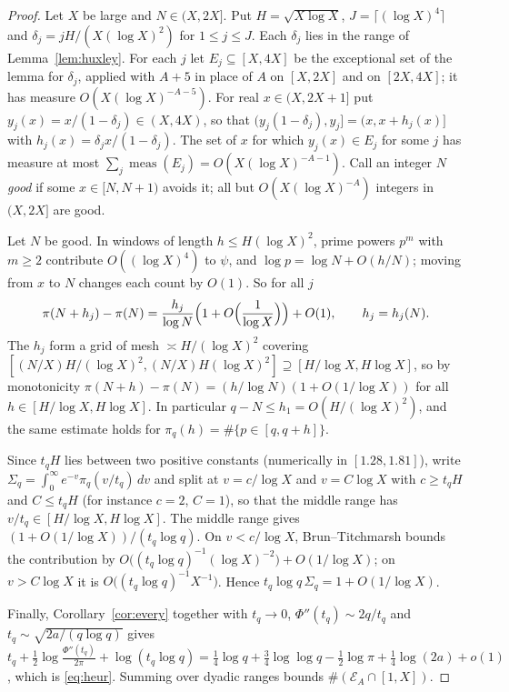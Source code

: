 \documentclass[11pt]{article}
\theoremstyle{remark}
\begin{document}
\begin{proof}
Let $X$ be large and $N\in(X,2X]$. Put $H=\sqrt{X\log X}$, $J=\lceil(\log X)^4\rceil$ and
$\delta_j=jH/(X(\log X)^2)$ for $1\le j\le J$. Each $\delta_j$ lies in the range of
Lemma~\ref{lem:huxley}. For each $j$ let $E_j\subseteq[X,4X]$ be the exceptional set of the lemma
for $\delta_j$, applied with $A+5$ in place of $A$ on $[X,2X]$ and on $[2X,4X]$; it has measure
$O(X(\log X)^{-A-5})$. For real $x\in(X,2X+1]$ put $y_j(x)=x/(1-\delta_j)\in(X,4X)$, so that
$(y_j(1-\delta_j),y_j]=(x,x+h_j(x)]$ with $h_j(x)=\delta_jx/(1-\delta_j)$. The set of $x$ for
which $y_j(x)\in E_j$ for some $j$ has measure at most
$\sum_j\operatorname{meas}(E_j)=O(X(\log X)^{-A-1})$. Call an integer $N$
\emph{good} if some $x\in[N,N+1)$ avoids it; all but $O(X(\log X)^{-A})$ integers in
$(X,2X]$ are good.

Let $N$ be good. In windows of length $h\le H(\log X)^2$, prime powers $p^m$ with $m\ge2$
contribute $O((\log X)^4)$ to $\psi$, and $\log p=\log N+O(h/N)$; moving from $x$ to $N$ changes
each count by $O(1)$. So for all $j$
\[
\pi(N+h_j)-\pi(N)=\frac{h_j}{\log N}\Bigl(1+O\Bigl(\frac1{\log X}\Bigr)\Bigr)+O(1),
\qquad h_j=h_j(N).
\]
The $h_j$ form a grid of mesh $\asymp H/(\log X)^2$ covering
$[(N/X)H/(\log X)^2,(N/X)H(\log X)^2]\supseteq[H/\log X,H\log X]$, so by monotonicity $\pi(N+h)-\pi(N)=(h/\log N)(1+O(1/\log X))$ for all
$h\in[H/\log X,H\log X]$. In particular $q-N\le h_1=O(H/(\log X)^2)$, and the same estimate
holds for $\pi_q(h)=\#\{p\in[q,q+h]\}$.

Since $t_qH$ lies between two positive constants (numerically in $[1.28,1.81]$), write
$\Sigma_q=\int_0^\infty e^{-v}\pi_q(v/t_q)\,dv$ and split at $v=c/\log X$ and $v=C\log X$ with
$c\ge t_qH$ and $C\le t_qH$ (for instance $c=2$, $C=1$), so that the middle range has
$v/t_q\in[H/\log X,H\log X]$. The middle range gives $(1+O(1/\log X))/(t_q\log q)$. On
$v<c/\log X$, Brun--Titchmarsh bounds the contribution by
$O\bigl((t_q\log q)^{-1}(\log X)^{-2}\bigr)+O(1/\log X)$; on $v>C\log X$ it is
$O\bigl((t_q\log q)^{-1}X^{-1}\bigr)$. Hence $t_q\log q\,\Sigma_q=1+O(1/\log X)$.

Finally, Corollary~\ref{cor:every} together with $t_q\to0$, $\Phi''(t_q)\sim2q/t_q$ and
$t_q\sim\sqrt{2a/(q\log q)}$ gives
$t_q+\frac12\log\frac{\Phi''(t_q)}{2\pi}+\log(t_q\log q)
=\frac14\log q+\frac34\log\log q-\frac12\log\pi+\frac14\log(2a)+o(1)$, which is
\eqref{eq:heur}. Summing over dyadic ranges bounds $\#(\mathcal E_A\cap[1,X])$.
\end{proof}
\end{document}
